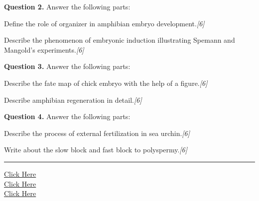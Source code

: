 \documentclass[11pt,a4paper]{article}
\newcommand{\pts}[1]{\hfill   \textit{[#1]}}
\begin{document}
\medskip


\noindent   \textbf{Question 2.} Answer the following parts:

\begin{parts}
  \item Define the role of organizer in amphibian embryo development.\pts{6}
  \item Describe the phenomenon of embryonic induction illustrating Spemann and Mangold's experiments.\pts{6}
\end{parts}

\medskip


\noindent   \textbf{Question 3.} Answer the following parts:

\begin{parts}
  \item Describe the fate map of chick embryo with the help of a figure.\pts{6}
  \item Describe amphibian regeneration in detail.\pts{6}
\end{parts}

\medskip


\noindent   \textbf{Question 4.} Answer the following parts:

\begin{parts}
  \item Describe the process of external fertilization in sea urchin.\pts{6}
  \item Write about the slow block and fast block to polyspermy.\pts{6}
\end{parts}

\vfill
\rule{\linewidth}{0.4pt}

\begin{center}\small
\href{https://bhu-exam.vercel.app/}{Click Here}\\[4pt]\href{https://me-aryan.vercel.app/}{Click Here}\\[4pt]\href{https://quashan-me.vercel.app/}{Click Here}
\end{center}
\end{document}
